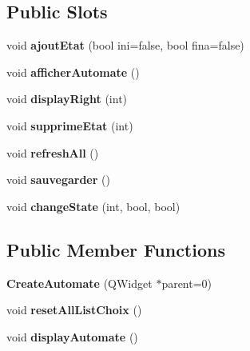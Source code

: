 \subsection*{Public Slots}
\begin{DoxyCompactItemize}
\item 
\hypertarget{class_create_automate_aa0b73cfa67f2921a14d69c8d7345ae53}{void {\bfseries ajout\-Etat} (bool ini=false, bool fina=false)}\label{class_create_automate_aa0b73cfa67f2921a14d69c8d7345ae53}

\item 
\hypertarget{class_create_automate_a66a9d64abf7e1ad5e4ac7611491d32e5}{void {\bfseries afficher\-Automate} ()}\label{class_create_automate_a66a9d64abf7e1ad5e4ac7611491d32e5}

\item 
\hypertarget{class_create_automate_a65385f4e187f8040945abf337a165630}{void {\bfseries display\-Right} (int)}\label{class_create_automate_a65385f4e187f8040945abf337a165630}

\item 
\hypertarget{class_create_automate_ae757fbbd26383fdf9d78b42905a4fb6a}{void {\bfseries supprime\-Etat} (int)}\label{class_create_automate_ae757fbbd26383fdf9d78b42905a4fb6a}

\item 
\hypertarget{class_create_automate_afda9720982becab25e51355c0e1e5d89}{void {\bfseries refresh\-All} ()}\label{class_create_automate_afda9720982becab25e51355c0e1e5d89}

\item 
\hypertarget{class_create_automate_a257c028c9d44547b9e3940b9260a1260}{void {\bfseries sauvegarder} ()}\label{class_create_automate_a257c028c9d44547b9e3940b9260a1260}

\item 
\hypertarget{class_create_automate_a433e2a76aaa801a883cdd76195987c7d}{void {\bfseries change\-State} (int, bool, bool)}\label{class_create_automate_a433e2a76aaa801a883cdd76195987c7d}

\end{DoxyCompactItemize}
\subsection*{Public Member Functions}
\begin{DoxyCompactItemize}
\item 
\hypertarget{class_create_automate_a564b1212466be9837975faf60f115862}{{\bfseries Create\-Automate} (Q\-Widget $\ast$parent=0)}\label{class_create_automate_a564b1212466be9837975faf60f115862}

\item 
\hypertarget{class_create_automate_a13c0f6c01986d1ef1173c84e7ff01768}{void {\bfseries reset\-All\-List\-Choix} ()}\label{class_create_automate_a13c0f6c01986d1ef1173c84e7ff01768}

\item 
\hypertarget{class_create_automate_ae3ab55bac630576c180865589a10c765}{void {\bfseries display\-Automate} ()}\label{class_create_automate_ae3ab55bac630576c180865589a10c765}

\end{DoxyCompactItemize}

